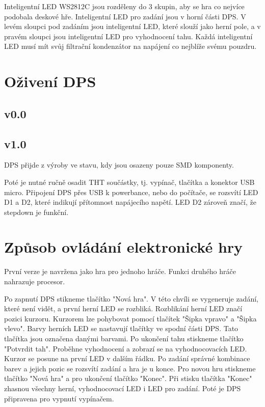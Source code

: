 Inteligentní LED WS2812C jsou rozděleny do 3 skupin, aby se hra co nejvíce podobala deskové hře. Inteligentní LED pro zadání 
jsou v horní části DPS. V levém sloupci pod zadáním jsou inteligentní LED, které slouží jako herní pole, a v pravém sloupci 
jsou inteligentní LED pro vyhodnocení tahu. Každá inteligentní LED musí mít svůj filtrační kondenzátor na napájení co nejblíže 
svému pouzdru.

\chapter{Oživení DPS}
\section{v0.0}

\section{v1.0}
DPS přijde z výroby ve stavu, kdy jsou osazeny pouze SMD komponenty. %

Poté je nutné ručně osadit THT součástky, tj. vypínač, tlačítka a konektor USB micro. Připojení DPS přes USB k powerbance, 
nebo do počítače, se rozsvítí LED D1 a D2, které indikují přítomnost napájecího napětí. LED D2 zároveň značí, že stepdown je 
funkční.

\chapter{Způsob ovládání elektronické hry}
První verze je navržena jako hra pro jednoho hráče. Funkci druhého hráče nahrazuje procesor.

Po zapnutí DPS stikneme tlačítko "Nová hra". V této chvíli se vygeneruje zadání, které není vidět, a první herní LED se 
rozbliká. Rozblikání herní LED značí pozici kurzoru. 
Kurzorem lze pohybovat pomocí tlačítek "Šipka vpravo" a "Šipka vlevo". Barvy herních LED se nastavují tlačítky ve spodní části 
DPS. Tato tlačítka jsou označena danými barvami.
Po ukončení tahu stiskneme tlačítko "Potvrdit tah". Proběhne vyhodnocení a zobrazí se na vyhodnocovacích LED. Kurzor se posune
na první LED v dalším řádku.
Po zadání správné kombinace barev a jejich pozic se rozsvítí zadání a hra je u konce. Pro novou hru stiskneme tlačítko
"Nová hra" a pro ukončení tlačítko "Konec".
Při stisku tlačítka "Konec" zhasnou všechny herní, vyhodnocovací LED i LED pro zadání. Poté je DPS připravena pro vypnutí
vypínačem.


















